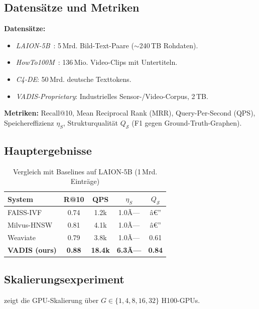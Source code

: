﻿\documentclass[12pt,a4paper]{article}
\begin{document}
\subsection{Datensätze und Metriken}

\textbf{Datensätze:}
\begin{itemize}[leftmargin=1.2em, itemsep=1pt, topsep=2pt]
  \item \textit{LAION-5B}~\cite{schuhmann2022laion}: 
        5\,Mrd. Bild-Text-Paare ($\sim$240\,TB Rohdaten).
  \item \textit{HowTo100M}~\cite{miech2019howto100m}: 
        136\,Mio. Video-Clips mit Untertiteln.
  \item \textit{C4-DE}: 50\,Mrd. deutsche Texttokens.
  \item \textit{VADIS-Proprietary}: 
        Industrielles Sensor-/Video-Corpus, 2\,TB.
\end{itemize}

\textbf{Metriken:} Recall@10, Mean Reciprocal Rank (MRR), 
Query-Per-Second (QPS), Speichereffizienz $\eta_S$, 
Strukturqualität $Q_{\mathcal{S}}$ (F1 gegen Ground-Truth-Graphen).

\subsection{Hauptergebnisse}

\begin{table}[ht]
\centering
\small
\caption{Vergleich mit Baselines auf LAION-5B (1\,Mrd. Einträge)}
\label{tab:results}
\begin{tabular}{@{}lcccc@{}}
\toprule
\textbf{System} & \textbf{R@10} & \textbf{QPS} & 
\textbf{$\eta_S$} & \textbf{$Q_\mathcal{S}$} \\
\midrule
FAISS-IVF & 0.74 & 1.2k & 1.0Ã— & â€” \\
Milvus-HNSW & 0.81 & 4.1k & 1.0Ã— & â€” \\
Weaviate & 0.79 & 3.8k & 1.0Ã— & 0.61 \\
\midrule
\textbf{VADIS (ours)} & \textbf{0.88} & \textbf{18.4k} & \textbf{6.3Ã—} & \textbf{0.84} \\
\bottomrule
\end{tabular}
\end{table}

\subsection{Skalierungsexperiment}

 zeigt die GPU-Skalierung über 
$G \in \{1, 4, 8, 16, 32\}$ H100-GPUs.
\end{document}
